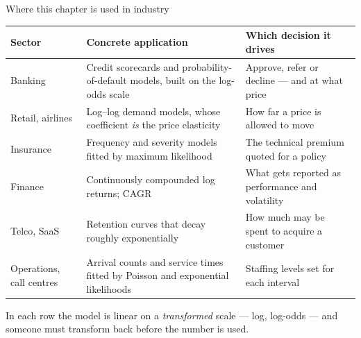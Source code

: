 \documentclass[aspectratio=169,11pt]{beamer}
\begin{document}
\begin{frame}{Where this chapter is used in industry}
  \scriptsize
  \begin{center}
  \begin{tabular}{@{}p{2.3cm}p{4.8cm}p{5.3cm}@{}}
    \toprule
    \textbf{Sector} & \textbf{Concrete application} & \textbf{Which decision it drives} \\
    \midrule
    Banking & Credit scorecards and probability-of-default models, built on
      the log-odds scale &
      Approve, refer or decline --- and at what price \\
    Retail, airlines & Log--log demand models, whose coefficient \emph{is}
      the price elasticity &
      How far a price is allowed to move \\
    Insurance & Frequency and severity models fitted by maximum likelihood &
      The technical premium quoted for a policy \\
    Finance & Continuously compounded log returns; CAGR &
      What gets reported as performance and volatility \\
    Telco, SaaS & Retention curves that decay roughly exponentially &
      How much may be spent to acquire a customer \\
    Operations, call centres & Arrival counts and service times fitted by
      Poisson and exponential likelihoods &
      Staffing levels set for each interval \\
    \bottomrule
  \end{tabular}
  \end{center}
  \begin{industry}
    In each row the model is linear on a \emph{transformed} scale --- log,
    log-odds --- and someone must transform back before the number is used.
  \end{industry}
\end{frame}
\end{document}
